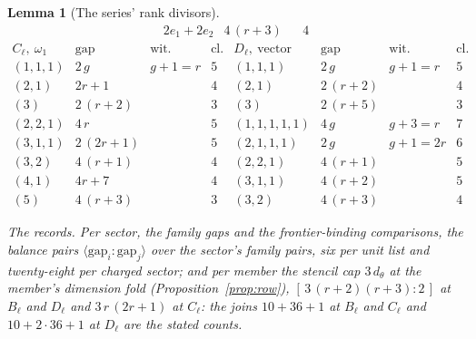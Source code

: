 \documentclass[11pt]{article}
\newtheorem{lemma}{Lemma}
\theoremstyle{definition}
\begin{document}
\begin{lemma}[The series' rank divisors]
\[\begin{array}{llll}
2e_1{+}2e_2 & 4\,(r+3) & & 4
\end{array}
\]
\[
\begin{array}{llll|llll}
C_\ell,\ \omega_1 & \mathrm{gap} & \text{wit.} & \text{cl.} &
D_\ell,\ \text{vector} & \mathrm{gap} & \text{wit.} & \text{cl.}\\
\hline
(1,1,1) & 2\,g & g{+}1{=}r & 5 & (1,1,1) & 2\,g & g{+}1{=}r & 5\\
(2,1) & 2r+1 & & 4 & (2,1) & 2\,(r+2) & & 4\\
(3) & 2\,(r+2) & & 3 & (3) & 2\,(r+5) & & 3\\
(2,2,1) & 4\,r & & 5 & (1,1,1,1,1) & 4\,g & g{+}3{=}r & 7\\
(3,1,1) & 2\,(2r+1) & & 5 & (2,1,1,1) & 2\,g & g{+}1{=}2r & 6\\
(3,2) & 4\,(r+1) & & 4 & (2,2,1) & 4\,(r+1) & & 5\\
(4,1) & 4r+7 & & 4 & (3,1,1) & 4\,(r+2) & & 5\\
(5) & 4\,(r+3) & & 3 & (3,2) & 4\,(r+3) & & 4
\end{array}
\]

\emph{The records.} Per sector, the family gaps and the
\emph{frontier-binding comparisons}, the balance pairs
$\langle\mathrm{gap}_i\!:\!\mathrm{gap}_j\rangle$ over the
sector's family pairs, six per unit list and twenty-eight per
charged sector; and per member the stencil cap $3\,d_\theta$ at
the member's dimension fold (Proposition~\ref{prop:row}),
$[\,3\,(r+2)(r+3):2\,]$ at $B_\ell$ and $D_\ell$ and
$3\,r\,(2r+1)$ at $C_\ell$: the joins $10+36+1$ at $B_\ell$ and
$C_\ell$ and $10+2\cdot36+1$ at $D_\ell$ are the stated counts.


\end{lemma}
\end{document}
